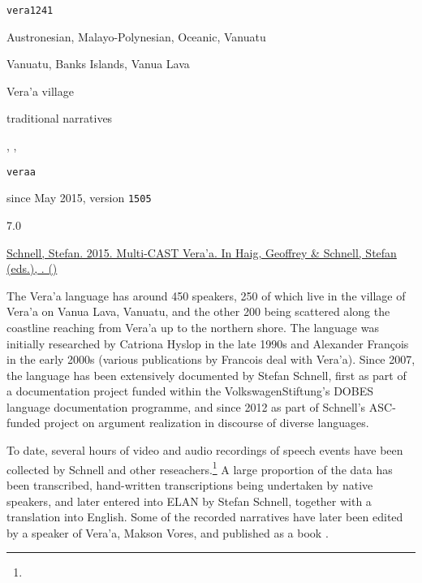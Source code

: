 \noindent{}

\begin{description}[labelwidth=6.5em,itemindent=0em,itemsep=0.25mm]
	\TabPositions{2em}
	\raggedright\small
	\item[glottocode]		\texttt{vera1241}
	\item[affiliation]		Austronesian, Malayo-Polynesian, Oceanic, Vanuatu
	\item[area spoken]		Vanuatu, Banks Islands, Vanua Lava
	\item[varieties rec'd]	Vera'a village
	\item[text types]		traditional narratives
	\item[sources]		, , 
	\medskip
	\item[identifier]		\texttt{veraa}
	\item[availability]		since May 2015, version \texttt{1505}
	\item[GRAID]		7.0		
	\item[RefIND]		\checkyes{}	
	\item[ISNRef]		\checkyes{}	
	\item[citation]		\hyperref[ssec:references-mc]{Schnell, Stefan. 2015. Multi-CAST Vera'a. In Haig, Geoffrey \& Schnell, Stefan (eds.), . ()} \nocite{Schnell2015}
\end{description}

\noindent The Vera'a language has around 450 speakers, 250 of which live in the village of Vera'a on Vanua Lava, Vanuatu, and the other 200 being scattered along the coastline reaching from Vera'a up to the northern shore. The language was initially researched by Catriona Hyslop in the late 1990s and Alexander François in the early 2000s (various publications by Francois deal with Vera'a). Since 2007, the language has been extensively documented by Stefan Schnell, first as part of a documentation project funded within the VolkswagenStiftung's DOBES language documentation programme, and since 2012 as part of Schnell's ASC-funded project on argument realization in discourse of diverse languages.

To date, several hours of video and audio recordings of speech events have been collected by Schnell and other reseachers.\footnote{} A large proportion of the data has been transcribed, hand-written transcriptions being undertaken by native speakers, and later entered into ELAN by Stefan Schnell, together with a translation into English. Some of the recorded narratives have later been edited by a speaker of Vera'a, Makson Vores, and published as a book .

